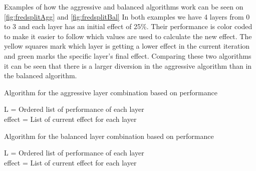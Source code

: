 Examples of how the aggressive and balanced algorithms work can be seen on \autoref{fig:fredsplitAgg} and \autoref{fig:fredsplitBal}
In both examples we have 4 layers from 0 to 3 and each layer has an initial effect of 25\%.
Their performance is color coded to make it easier to follow which values are used to calculate the new effect.
The yellow squares mark which layer is getting a lower effect in the current iteration and green marks the specific layer's final effect.
Comparing these two algorithms it can be seen that there is a larger diversion in the aggressive algorithm than in the balanced algorithm.
\begin{algorithm}
    \caption{Algorithm for the aggressive layer combination based on performance}
    \SetAlgoLined
    L = Ordered list of performance of each layer \\
    effect  = List of current effect for each layer \\
    \label{alg:aggresive-layereffect}
\end{algorithm}

\begin{algorithm}
    \caption{Algorithm for the balanced layer combination based on performance}
    \SetAlgoLined
    L = Ordered list of performance of each layer \\
    effect  = List of current effect for each layer \\
    \label{alg:bal-layereffect}
\end{algorithm}


